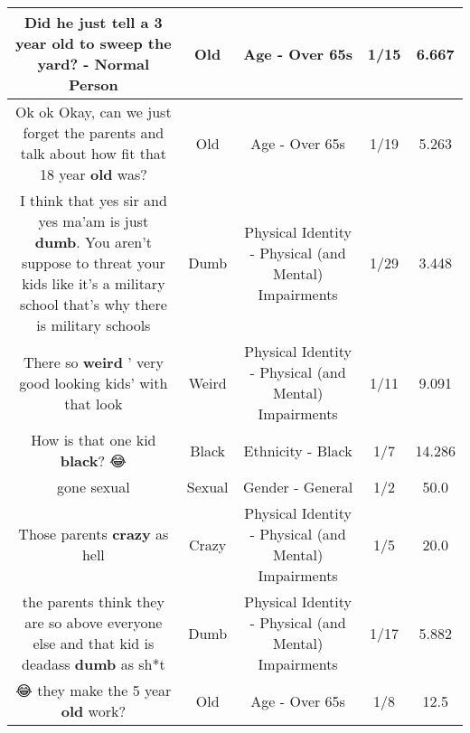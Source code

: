 \documentclass[11pt]{article}
\newlength\mylength
\begin{document}
\begin{center}
\begin{longtable}{|C{.65\mylength}|C{.30\mylength}|C{.12\mylength}|C{.12\mylength}|C{.12\mylength}|}
  \small Did he just tell a 3 year \textbf{old} to sweep the yard? - Normal Person\normalsize   & Old & Age - Over 65s & 1/15 & 6.667 \\  \hline
  \small Ok ok Okay, can we just forget the parents and talk about how fit that 18 year \textbf{old} was?\normalsize   & Old & Age - Over 65s & 1/19 & 5.263 \\  \hline
  \small I think that yes sir and yes ma'am is just \textbf{dumb}. You aren't suppose to threat your kids like it's a military school that's why there is military schools\normalsize   & Dumb & Physical Identity - Physical (and Mental) Impairments & 1/29 & 3.448 \\  \hline
  \small There so \textbf{weird} ' very good looking kids' with that look\normalsize   & Weird & Physical Identity - Physical (and Mental) Impairments & 1/11 & 9.091 \\  \hline
  \small How is that one kid \textbf{black}? 😂\normalsize   & Black & Ethnicity - Black & 1/7 & 14.286 \\  \hline
  \small *gone sexual\normalsize   & Sexual & Gender - General & 1/2 & 50.0 \\  \hline
  \small Those parents \textbf{crazy} as hell\normalsize   & Crazy & Physical Identity - Physical (and Mental) Impairments & 1/5 & 20.0 \\  \hline
  \small the parents think they are so above everyone else and that kid is deadass \textbf{dumb} as sh*t\normalsize   & Dumb & Physical Identity - Physical (and Mental) Impairments & 1/17 & 5.882 \\  \hline
  \small 😂 they make the 5 year \textbf{old} work?\normalsize   & Old & Age - Over 65s & 1/8 & 12.5 \\  \hline

\end{longtable}
\end{center}
\end{document}
